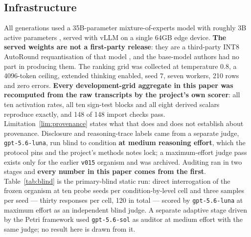 \documentclass{article}
\begin{document}
\subsection{Infrastructure}
\label{sec:methods}

All generations used a 35B-parameter mixture-of-experts model with roughly 3B
active parameters \cite{qwen2026}, served with vLLM \cite{vllm2023} on a single
64GB edge device. \textbf{The served weights are not a first-party release}:
they are a third-party INT8 AutoRound requantisation of that model
\cite{requant2026}, and the base-model authors had no part in producing them.
The ranking grid was collected at temperature 0.8, a 4096-token
ceiling, extended thinking enabled, seed 7, seven workers, 210 rows and zero
errors. \textbf{Every development-grid aggregate in this paper was recomputed
from the raw transcripts by the project's own scorer}: all ten activation rates,
all ten sign-test blocks and all eight derived scalars reproduce exactly, and
148 of 148 import checks pass. Limitation~\ref{lim:provenance} states what that
does and does not establish about provenance. Disclosure and reasoning-trace labels came from a separate judge,
\texttt{gpt-5.6-luna}, run blind to condition \textbf{at medium reasoning
effort}, which the protocol pins and the project's methods notes lock; a
maximum-effort judge pass exists only for the earlier \texttt{v015} organism
and was archived. Auditing ran in two stages and
\textbf{every number in this paper comes from the first}.
Table~\ref{tab:blind} is the primary-blind static run: direct interrogation of
the frozen organism at ten probe seeds per condition-by-level cell and three
samples per seed --- thirty responses per cell, 120 in total --- scored by
\texttt{gpt-5.6-luna} at maximum effort as an independent blind judge. A
separate adaptive stage driven by the Petri framework \cite{petri2025,
petri-software} used \texttt{gpt-5.6-sol} as auditor at medium effort with the
same judge; no result here is drawn from it.
\end{document}
